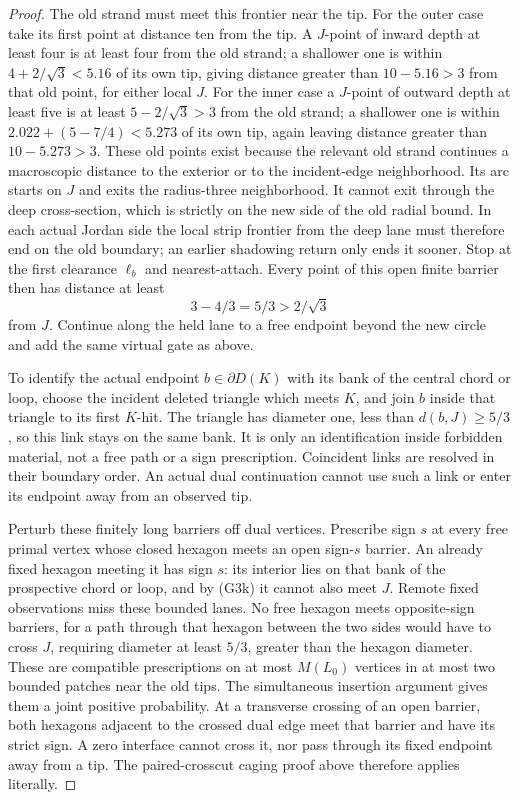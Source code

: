 \begin{proof}
The old strand must meet this frontier near the tip.  For the outer case take its first point at
distance ten from the tip.  A \(J\)-point of inward depth at least four
is at least four from the old strand; a shallower one is within
\(4+2/\sqrt3<5.16\) of its own tip, giving distance greater than
\(10-5.16>3\) from that old point, for either local \(J\).
For the inner case a \(J\)-point of outward depth at least five is at
least \(5-2/\sqrt3>3\) from the old strand; a shallower one is within
\(2.022+(5-7/4)<5.273\) of its own tip, again leaving distance greater
than \(10-5.273>3\).  These old points exist because the relevant old
strand continues a macroscopic distance to the exterior or to the
incident-edge neighborhood.  Its arc starts on \(J\) and exits the
radius-three neighborhood.  It cannot exit through the deep cross-section,
which is strictly on the new side of the old radial bound.  In each actual
Jordan side the local strip frontier from the deep lane must therefore end
on the old boundary; an earlier shadowing return only ends it sooner.
Stop at the first clearance
\(\ell_b\) and nearest-attach.  Every point of this open finite barrier
then has distance at least
\[
                  3-4/3=5/3>2/\sqrt3                       \tag{G3k}
\]
from \(J\).  Continue along the held lane to a free endpoint beyond the
new circle and add the same virtual gate as above.

To identify the actual endpoint \(b\in\partial D(K)\) with its bank of
the central chord or loop, choose the incident deleted triangle which
meets \(K\), and join \(b\) inside that triangle to its first \(K\)-hit.
The triangle has diameter one, less than \(d(b,J)\ge5/3\), so this link
stays on the same bank.  It is only an identification inside forbidden
material, not a free path or a sign prescription.  Coincident links are
resolved in their boundary order.  An actual dual continuation cannot use
such a link or enter its endpoint away from an observed tip.

Perturb these finitely long barriers off dual vertices.  Prescribe sign
\(s\) at every free primal vertex whose closed hexagon meets an open
sign-\(s\) barrier.  An already fixed hexagon meeting it has sign \(s\):
its interior lies on that bank of the prospective chord or loop, and by
(G3k) it cannot also meet \(J\).  Remote fixed observations miss these
bounded lanes.  No free hexagon meets opposite-sign barriers, for a path
through that hexagon between the two sides would have to cross \(J\),
requiring diameter at least \(5/3\), greater than the hexagon diameter.
These are compatible prescriptions on at most \(M(L_0)\) vertices in
at most two bounded patches near the old tips.  The simultaneous insertion
argument gives them a joint positive probability.  At a transverse crossing
of an open barrier, both hexagons adjacent to the crossed dual edge meet
that barrier and have its strict sign.  A zero interface cannot cross it,
nor pass through its fixed endpoint away from a tip.  The paired-crosscut
caging proof above therefore applies literally.


\end{proof}

